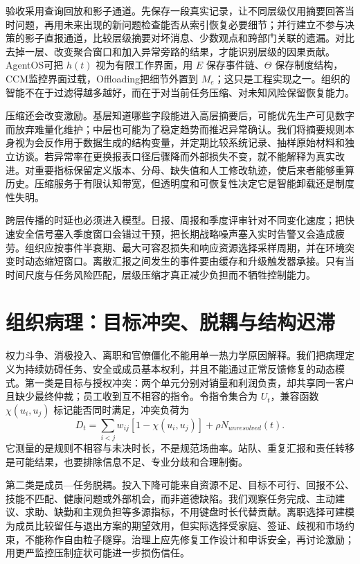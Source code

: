 验收采用查询回放和影子通道。先保存一段真实记录，让不同层级仅用摘要回答当时问题，再用未来出现的新问题检查能否从索引恢复必要细节；并行建立不参与决策的影子直报通道，比较层级摘要对坏消息、少数观点和跨部门关联的遗漏。对比去掉一层、改变聚合窗口和加入异常旁路的结果，才能识别层级的因果贡献。AgentOS可把 $h(t)$ 视为有限工作界面，用 $E$ 保存事件链、$\Theta$ 保存制度结构，CCM监控界面过载，Offloading把细节外置到 $M_e$；这只是工程实现之一。组织的智能不在于过滤得越多越好，而在于对当前任务压缩、对未知风险保留恢复能力。

压缩还会改变激励。基层知道哪些字段能进入高层摘要后，可能优先生产可见数字而放弃难量化维护；中层也可能为了稳定趋势而推迟异常确认。我们将摘要规则本身视为会反作用于数据生成的结构变量，并定期比较系统记录、抽样原始材料和独立访谈。若异常率在更换报表口径后骤降而外部损失不变，就不能解释为真实改进。对重要指标保留定义版本、分母、缺失值和人工修改轨迹，使后来者能够重算历史。压缩服务于有限认知带宽，但透明度和可恢复性决定它是智能卸载还是制度性失明。

跨层传播的时延也必须进入模型。日报、周报和季度评审针对不同变化速度；把快速安全信号塞入季度窗口会错过干预，把长期战略噪声塞入实时告警又会造成疲劳。组织应按事件半衰期、最大可容忍损失和响应资源选择采样周期，并在环境突变时动态缩短窗口。离散汇报之间发生的事件要由缓存和升级触发器承接。只有当时间尺度与任务风险匹配，层级压缩才真正减少负担而不牺牲控制能力。

\section{组织病理：目标冲突、脱耦与结构迟滞}
\label{sec:org_pathological_topology}

权力斗争、消极投入、离职和官僚僵化不能用单一热力学原因解释。我们把病理定义为持续妨碍任务、安全或成员基本权利，并且不能通过正常反馈修复的动态模式。第一类是目标与授权冲突：两个单元分别对销量和利润负责，却共享同一客户且缺少最终仲裁；员工收到互不相容的指令。令指令集合为 $U_t$，兼容函数 $\chi(u_i,u_j)$ 标记能否同时满足，冲突负荷为
\begin{equation}
 D_t=\sum_{i<j}w_{ij}[1-\chi(u_i,u_j)]+\rho N_{unresolved}(t).
\end{equation}
它测量的是规则不相容与未决时长，不是规范场曲率。站队、重复汇报和责任转移是可能结果，也要排除信息不足、专业分歧和合理制衡。

第二类是成员—任务脱耦。投入下降可能来自资源不足、目标不可行、回报不公、技能不匹配、健康问题或外部机会，而非道德缺陷。我们观察任务完成、主动建议、求助、缺勤和主观负担等多源指标，不用键盘时长代替贡献。离职选择可建模为成员比较留任与退出方案的期望效用，但实际选择受家庭、签证、歧视和市场约束，不能称作自由粒子隧穿。治理上应先修复工作设计和申诉安全，再讨论激励；用更严监控压制症状可能进一步损伤信任。

